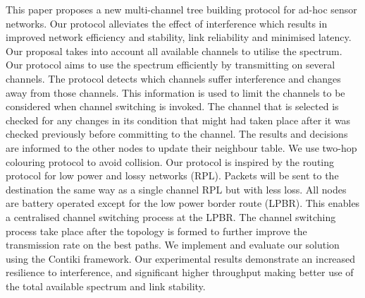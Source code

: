 This paper proposes a new multi-channel tree building protocol for ad-hoc sensor networks. Our protocol alleviates the effect of interference which results in improved network efficiency and stability, link reliability and minimised latency. 
        Our proposal takes into account all available channels to utilise the spectrum. Our protocol aims to use the spectrum efficiently by transmitting on several channels. The protocol detects which channels suffer interference and changes away from those channels.
This information is used to limit the channels to be considered when channel switching is invoked. The channel that is selected is checked for any changes in its condition that might had taken place after it was checked previously before committing to the channel. The results and decisions are informed to the other nodes to update their neighbour table. We use two-hop colouring protocol to avoid collision. 
	Our protocol is inspired by the routing protocol for low power and lossy networks (RPL). Packets will be sent to the destination the same way as a single channel RPL but with less loss. 
	All nodes are battery operated except for the low power border route (LPBR). This enables a centralised channel switching process at the LPBR. The channel switching process take place after the topology is formed to further improve the transmission rate on the best paths.
	We implement and evaluate our solution using the Contiki framework. Our experimental results demonstrate an increased resilience to interference, and significant higher throughput making better use of the total available spectrum and link stability. 
